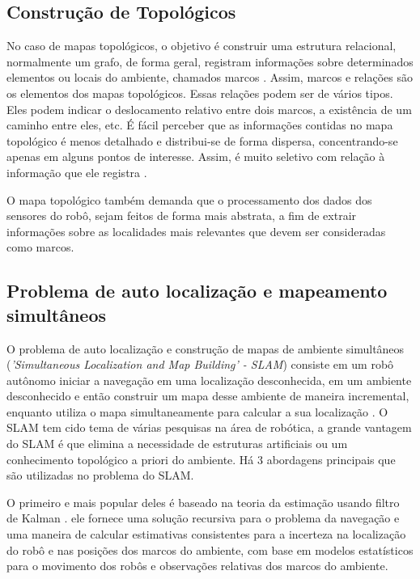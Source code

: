 \documentclass[12pt]{article}
\begin{document}
\subsection{Construção de Topológicos}
No caso de mapas topológicos, o objetivo é construir uma estrutura relacional, normalmente um grafo, 
de forma geral, registram informações sobre determinados
elementos ou locais do ambiente, chamados marcos \cite{construcaoMapas2}. Assim, marcos e relações são
os elementos dos mapas topológicos.
Essas relações podem ser de vários tipos. Eles podem indicar o deslocamento
relativo entre dois marcos, a existência de um caminho entre eles, etc. É fácil perceber que as informações contidas no mapa topológico é
menos detalhado e distribui-se de forma dispersa, concentrando-se apenas em alguns pontos de interesse.
Assim, é muito seletivo com relação à informação que ele registra \cite{construcaoMapas2}. 

O mapa topológico também demanda que o processamento
dos dados dos sensores do robô, sejam feitos de forma mais abstrata, a fim de extrair informações sobre as localidades mais relevantes que devem ser consideradas
como marcos.

\subsection{Problema de auto localização e mapeamento simultâneos}
  O problema de auto localização e construção de mapas de ambiente simultâneos (\textit{'Simultaneous Localization and
Map Building' - SLAM}) consiste em um robô autônomo iniciar a navegação
em uma localização desconhecida, em um ambiente desconhecido e então construir um mapa
desse ambiente de maneira incremental, enquanto utiliza o mapa simultaneamente para calcular a sua localização \cite{slam}.
 O SLAM tem cido tema de várias pesquisas na área de robótica, a grande vantagem do SLAM é que elimina a necessidade de estruturas artificiais ou
um conhecimento topológico a priori do ambiente. Há 3 abordagens principais que são utilizadas no problema do SLAM. 

O primeiro e mais popular deles é baseado na teoria da estimação usando filtro de Kalman \cite{slam}. ele
fornece uma solução recursiva para o problema da navegação e uma maneira de calcular
estimativas consistentes para a incerteza na localização do robô e nas posições dos marcos do
ambiente, com base em modelos estatísticos para o movimento dos robôs e observações
relativas dos marcos do ambiente\cite{slam}.
\end{document}
